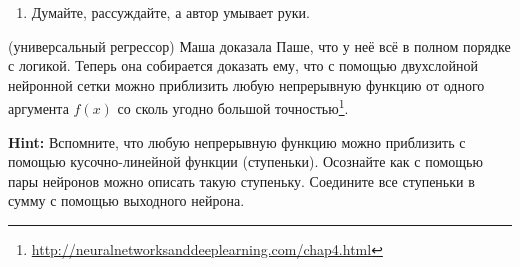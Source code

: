 \begin{sol}
\begin{enumerate}
\begin{center}
\end{center}

\item Думайте, рассуждайте, а автор умывает руки.
\end{enumerate} 
\end{sol} 


\begin{problem}{(универсальный регрессор)}
Маша доказала Паше, что у неё всё в полном порядке с логикой. Теперь она собирается доказать ему, что с помощью двухслойной нейронной сетки можно приблизить любую непрерывную функцию от одного аргумента $f(x)$ со сколь угодно большой точностью\footnote{\url{http://neuralnetworksanddeeplearning.com/chap4.html}}.  

\textbf{Hint:}  Вспомните, что любую непрерывную функцию можно приблизить с помощью кусочно-линейной функции (ступеньки). Осознайте как с помощью пары нейронов можно описать такую ступеньку. Соедините все ступеньки в сумму с помощью выходного нейрона. 
\end{problem}


